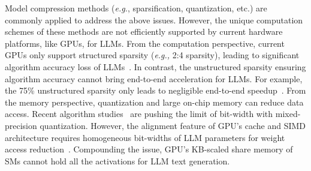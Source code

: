 
Model compression methods \cite{deng2020model} (\textit{e.g.}, sparsification, quantization, etc.) are commonly applied to address the above issues.
However, the unique computation schemes of these methods are not efficiently supported by current hardware platforms, like GPUs, for LLMs.
From the computation perspective, current GPUs only support structured sparsity (\textit{e.g.,} 2:4 sparsity), leading to significant algorithm accuracy loss of LLMs~\cite{frantar2023sparsegpt}. 
In contrast, the unstructured sparsity ensuring algorithm accuracy cannot bring end-to-end acceleration for LLMs. 
For example, the 75\% unstructured sparsity only leads to negligible end-to-end speedup~\cite{feng2023diffuser}. 
From the memory perspective, quantization and large on-chip memory can reduce data access. 
Recent algorithm studies~\citep{squeezellm,llmint8} are pushing the limit of bit-width with mixed-precision quantization. 
However, the alignment feature of GPU's cache and SIMD architecture requires homogeneous bit-widths of LLM parameters for weight access reduction~\cite{xiao2023smoothquant}. 
Compounding the issue, GPU's KB-scaled share memory of SMs cannot hold all the activations for LLM text generation.





